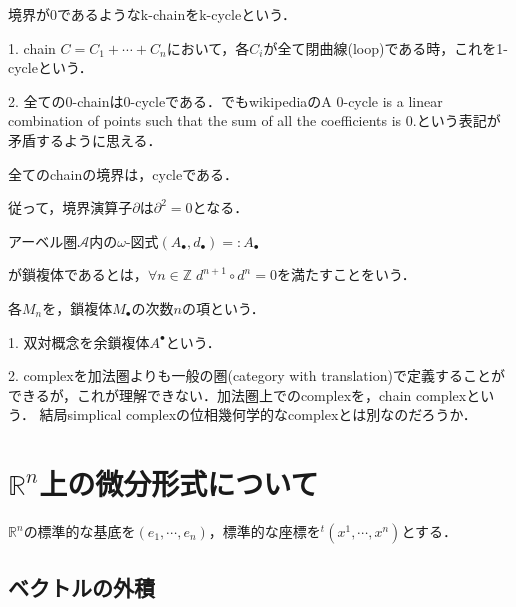 \documentclass[uplatex, dvipdfmx]{jsreport}
\begin{document}
\begin{definition}[cycle]
    境界が0であるようなk-chainをk-cycleという．
\end{definition}
\begin{example}
    1. chain $C=C_1+\cdots+C_n$において，各$C_i$が全て閉曲線(loop)である時，これを1-cycleという．

    2. 全ての0-chainは0-cycleである．でもwikipediaのA 0-cycle is a linear combination of points such that the sum of all the coefficients is 0.という表記が矛盾するように思える．
\end{example}
\begin{proposition}
    全てのchainの境界は，cycleである．
\end{proposition}
\begin{remark}
    従って，境界演算子$\partial$は$\partial^2=0$となる．
\end{remark}

\begin{definition}
    アーベル圏$\mathcal{A}$内の$\omega$-図式$(A_\bullet,d_\bullet)=:A_\bullet$
    \begin{center}
    \end{center}
    が鎖複体であるとは，$\forall n\in\mathbb{Z}\; d^{n+1}\circ d^n=0$を満たすことをいう．

    各$M_n$を，鎖複体$M_\bullet$の次数$n$の項という．
\end{definition}
\begin{remark}
    1. 双対概念を余鎖複体$A^\bullet$という．

    2. complexを加法圏よりも一般の圏(category with translation)で定義することができるが，これが理解できない．加法圏上でのcomplexを，chain complexという．
    結局simplical complexの位相幾何学的なcomplexとは別なのだろうか．
\end{remark}

\chapter{$\mathbb{R}^n$上の微分形式について}
$\mathbb{R}^n$の標準的な基底を$(e_1,\cdots,e_n)$，標準的な座標を${}^t(x^1,\cdots,x^n)$とする．

\section{ベクトルの外積}
\end{document}
